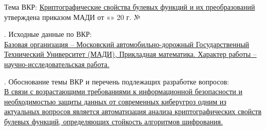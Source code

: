\documentclass[14pt, a4paper]{extarticle}
\begin{document}
\vspace{0.4cm}

\noindent Тема ВКР: \uline{Криптографические свойства булевых функций и их преобразований} \\
утверждена приказом МАДИ от «\underline{\hspace{0.6cm}}» \underline{\hspace{3cm}} 20\underline{\hspace{0.6cm}} г. № \underline{\hspace{2cm}}


\vspace{0.3cm}

. Исходные данные по ВКР: \\
\uline{Базовая организация -- Московский автомобильно-дорожный Государственный %
Технический Университет (МАДИ), Прикладная математика. Характер работы -- %
научно-исследовательская работа.}

\vspace{0.3cm}

. Обоснование темы ВКР и перечень подлежащих разработке вопросов: \\
\noindent \uline{В связи с возрастающими требованиями к информационной безопасности
и необходимостью защиты данных от современных киберугроз одним из актуальных вопросов
является автоматизация анализа криптографических свойств булевых функций, определяющих
стойкость алгоритмов шифрования.}


\newpage
\end{document}
